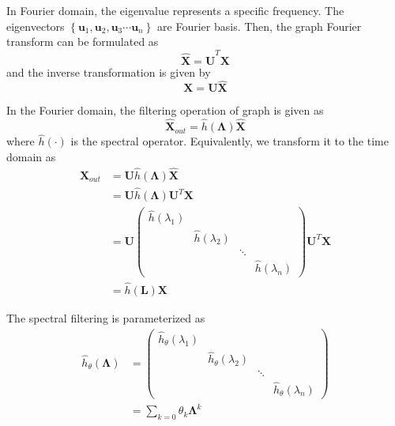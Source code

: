 \documentclass[journal]{IEEEtran}
\begin{document}
In Fourier domain, the eigenvalue represents a specific frequency. The eigenvectors $\left\{ \mathbf{u}_1,\mathbf{u}_2,\mathbf{u}_3 \cdots \mathbf{u}_n \right\}$ are Fourier basis. Then, the graph Fourier transform can be formulated as
\begin{equation}
\mathbf{\hat{X}=U}^T\mathbf{X}
\end{equation}
and the inverse transformation is given by
\begin{equation}
\mathbf{X=U\hat{X}}
\end{equation}

In the Fourier domain, the filtering operation of graph is given as
\begin{equation}
\mathbf{\hat{X}}_{out}=  \hat{h} (\mathbf{\Lambda}) \mathbf{\hat{X}}
\end{equation}
where $\hat{h}(\cdot)$ is the spectral operator.
Equivalently, we transform it to the time domain as
\begin{equation}
\begin{aligned}
\mathbf{X}_{out} &= \mathbf{U} \hat{h} \mathbf{(\Lambda )} \mathbf{\hat{X}} \\
&= \mathbf{U} \hat{h} \mathbf{(\Lambda)} \mathbf{U}^T \mathbf{X}  \\
&= \mathbf{U} \left(\begin{matrix}
\hat{h}( \lambda_{1}) & \\
& \hat{h}( \lambda_{2}) \\
& & \ddots \\
& & & \hat{h}(\lambda_{n})
\end{matrix}\right) \mathbf{U}^T \mathbf{X} \\
&= \hat{h}(\mathbf{L}) \mathbf{X}
\end{aligned}
\end{equation}

The spectral filtering is parameterized as
\begin{equation}
\begin{aligned}
\hat{h}_\theta \left( \mathbf{\Lambda} \right)
& = \left(\begin{matrix}
\hat{h}_{\theta}  \left( \lambda_{1} \right) & \\
&  \hat{h}_\theta \left( \lambda_{2} \right) \\
& & \ddots \\
& & & \hat{h}_\theta \left( \lambda_{n} \right)
\end{matrix}\right) \\
&= \sum_{k=0} \theta_k \mathbf{\Lambda}^k
\end{aligned}
\end{equation}
\end{document}
